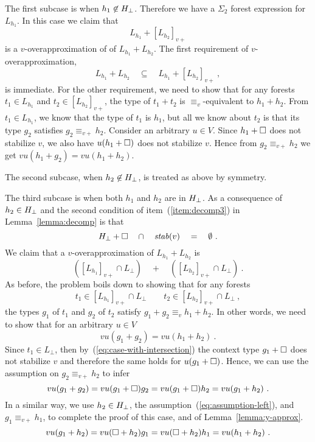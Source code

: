 \documentclass{LMCS}
\begin{document}
The first subcase is when $h_1 \not\in {H_\bot}$.
Therefore we have a $\Sigma_2$ forest expression for $L_{h_1}$. In
this case we claim that
\[
  L_{h_1} + [L_{h_2}]_{v+}
\]
is a $v$-overapproximation of of $L_{h_1} + L_{h_2}$.  The first
requirement of  $v$-overapproximation, 
\[
L_{h_1} + L_{h_2} \quad \subseteq \quad  L_{h_1} + [L_{h_2}]_{v+}\ ,
\]
is immediate. For the other requirement, we need to show that for any
forests $t_1 \in L_{h_1}$ and $t_2 \in [L_{h_2}]_{v+}$, the type of
$t_1 + t_2$ is $\equiv_{v}$-equivalent to $h_1 + h_2$.  From $t_1 \in
L_{h_1}$, we know that the type of $t_1$ is $h_1$, but all we know
about $t_2$ is that its type $g_2$ satisfies $g_2 \equiv_{v+}
h_2$. Consider an arbitrary $u\in V$. Since $h_1 + \Box$ does not stabilize
$v$, we also have $u(h_1 + \Box)$ does not stabilize $v$. Hence from $g_2 \equiv_{v+}
h_2$ we get $vu(h_1 + g_2)=vu(h_1+h_2)$.

The second subcase, when $h_2 \not\in {H_\bot}$, is treated as above by symmetry.

The third subcase is when both $h_1$ and $h_2$ are in ${H_\bot}$.
As a consequence of $h_2 \in {H_\bot}$ and the second condition of item~(\ref{item:decomp3}) in Lemma~\ref{lemma:decomp} is that
\begin{equation}
  \label{eq:case-with-intersection}
   {H_\bot} + \Box \quad \cap \quad  \mathit{stab}(v) \quad  =  \quad \emptyset\ .
\end{equation}
We claim that a $v$-overapproximation of $L_{h_1}
+ L_{h_2}$ is 
\begin{equation}
  \label{eq:xy-overapprox}
    ([L_{h_1}]_{v+} \cap L_\bot) \quad   + \quad     ([L_{h_2}]_{v+}
    \cap L_\bot)\ .
\end{equation}
As before, the problem boils down to showing that for any forests 
\[
    t_1 \in [L_{h_1}]_{v+} \cap L_\bot  \qquad      t_2 \in [L_{h_2}]_{v+}
    \cap L_\bot\ ,
\]
the types $g_1$ of $t_1$ and $g_2$ of $t_2$ satisfy $g_1 + g_2
\equiv_v h_1 + h_2$. In other words, we need to show that for an arbitrary $u
\in V$ 
\[
  vu(g_1 + g_2) = vu(h_1+h_2)\ .
\]
Since $t_1 \in L_\bot$, then by~(\ref{eq:case-with-intersection}) the context
type $g_1+ \Box$ does not stabilize $v$ and therefore the same holds for
$u(g_1+ \Box)$. Hence, we can use the assumption on $g_2 \equiv_{v+} h_2$
to infer
\[
  vu(g_1 + g_2) = vu(g_1+\Box)g_2 = vu(g_1+\Box)h_2 = vu(g_1 + h_2) \ .
\]
In a similar way, we use $h_2 \in {H_\bot}$, the
assumption~(\ref{eq:assumption-left}), and $g_1 \equiv_{v+} h_1$, to
complete the proof of this case, and of  Lemma~\ref{lemma:y-approx}.
\[
  vu(g_1 + h_2) = vu(\Box + h_2)g_1 =vu(\Box + h_2)h_1 = vu(h_1+h_2)\ .
\]
\end{document}
